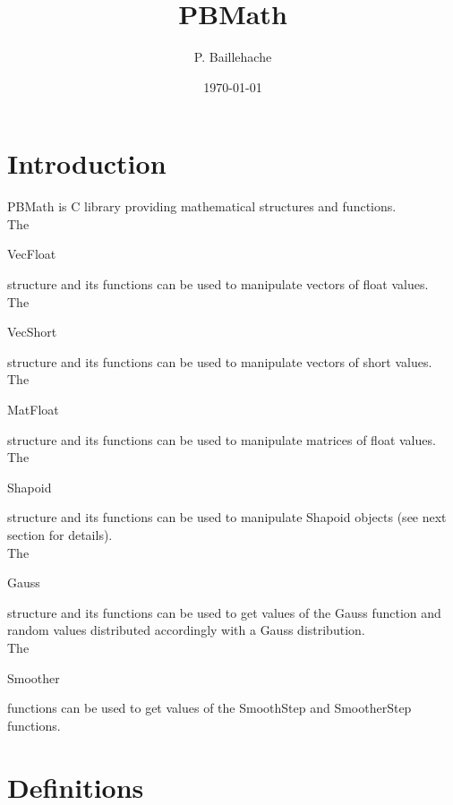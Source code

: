 \documentclass[12pt, a4paper]{article}
\begin{document}
\title{PBMath}
\author{P. Baillehache}
\date{\today}
\maketitle

\tableofcontents

\section*{Introduction}

PBMath is C library providing mathematical structures and functions.\\ 

The \begin{ttfamily}VecFloat\end{ttfamily} structure and its functions can be used to manipulate vectors of float values.\\

The \begin{ttfamily}VecShort\end{ttfamily} structure and its functions can be used to manipulate vectors of short values.\\

The \begin{ttfamily}MatFloat\end{ttfamily} structure and its functions can be used to manipulate matrices of float values.\\

The \begin{ttfamily}Shapoid\end{ttfamily} structure and its functions can be used to manipulate Shapoid objects (see next section for details).\\

The \begin{ttfamily}Gauss\end{ttfamily} structure and its functions can be used to get values of the Gauss function and random values distributed accordingly with a Gauss distribution.\\

The \begin{ttfamily}Smoother\end{ttfamily} functions can be used to get values of the SmoothStep and SmootherStep functions.\\

\section{Definitions}
\end{document}
